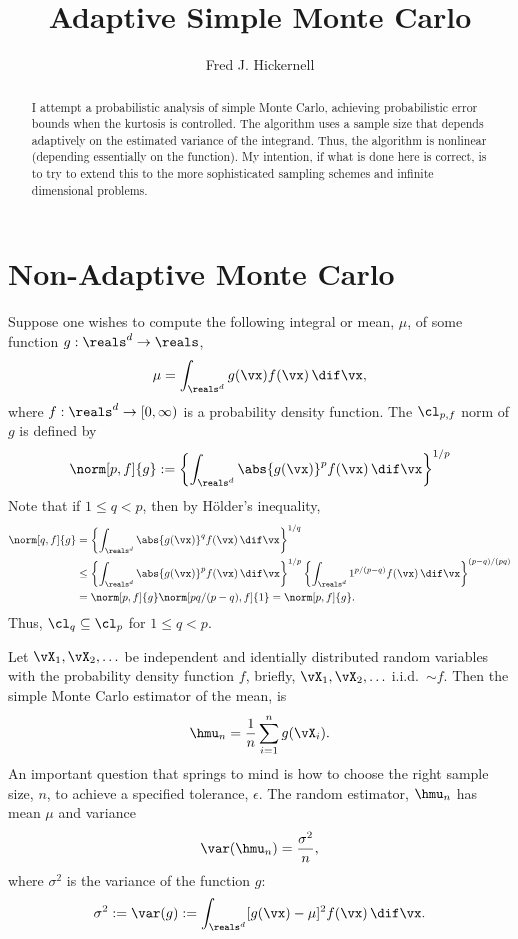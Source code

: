 \documentclass[12pt]{amsart}
\begin{document}
\title{Adaptive Simple Monte Carlo}
\author{Fred J. Hickernell}
\begin{abstract}I attempt a probabilistic analysis of simple Monte Carlo, achieving probabilistic error bounds when the kurtosis is controlled.  The algorithm uses a sample size that depends adaptively on the estimated variance of the integrand.  Thus, the algorithm is nonlinear (depending essentially on the function).  My intention, if what is done here is correct, is to try to extend this to the more sophisticated sampling schemes and infinite dimensional problems.
\end{abstract}
\maketitle

\section{Non-Adaptive Monte Carlo}
Suppose one wishes to compute the following integral or mean, $\mu$, of some function $g: \reals^d \to \reals$,
\begin{equation*}
\mu= \int_{\reals^d} g(\vx) f(\vx) \, \dif \vx,
\end{equation*}
where $f: \reals^d \to [0,\infty)$ is a probability density function.  The $\cl_{p,f}$ norm of $g$ is defined by
\[
\norm[p,f]{g} :=\left\{\int_{\reals^d} \abs{g(\vx)}^p f(\vx) \, \dif \vx\right\}^{1/p}
\]
Note that if $1 \le q<p$, then by H\"older's inequality,
\begin{align}\label{LP}
\nonumber \norm[q,f]{g} &=\left\{\int_{\reals^d} \abs{g(\vx)}^q f(\vx) \, \dif \vx\right\}^{1/q}\\
\nonumber & \le \left\{\int_{\reals^d} \abs{g(\vx)}^p f(\vx) \, \dif \vx \right\}^{1/p} \left\{\int_{\reals^d} 1^{p/(p-q)} f(\vx) \, \dif \vx\right\}^{(p-q)/(pq)} \\
& = \norm[p,f]{g} \norm[pq/(p-q),f]{1} = \norm[p,f]{g}.
\end{align}
Thus, $\cl_q \subseteq \cl_p$ for $1 \le q<p$.

Let $\vX_1, \vX_2, \ldots$ be independent and identially distributed random variables with the probability density function $f$, briefly, $\vX_1, \vX_2, \ldots$ i.i.d.\ $\sim f$.  Then the simple Monte Carlo estimator of the mean, is
\begin{equation} \label{simpleMCest}
\hmu_n = \frac 1n \sum_{i=1}^n g(\vX_i).
\end{equation}
An important question that springs to mind is how to choose the right sample size, $n$, to achieve a specified tolerance, $\epsilon$.  The random estimator, $\hmu_n$ has mean $\mu$ and variance
\begin{equation*}
\var(\hmu_n) = \frac{\sigma^2}{n},
\end{equation*}
where $\sigma^2$ is the variance of the function $g$:
\begin{equation} \label{sigmadef}
\sigma^2 := \var(g) := \int_{\reals^d} [g(\vx)-\mu]^2 f(\vx) \, \dif \vx.
\end{equation}
\end{document}
